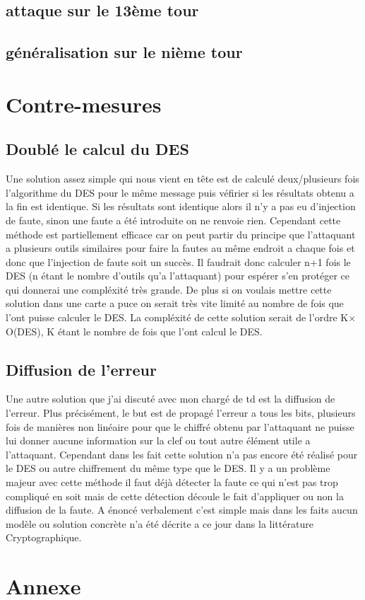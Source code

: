 \documentclass[a4paper]{report}
\begin{document}
			\section{attaque sur le 13ème tour}
			\section{généralisation sur le nième tour}
		
		\chapter{Contre-mesures}
			\section{Doublé le calcul du DES}
				Une solution assez simple qui nous vient en tête est de calculé deux/plusieurs fois l'algorithme du DES pour le même message puis véfirier si les résultats obtenu a la fin est
				identique.
				Si les résultats sont identique alors il n'y a pas eu d'injection de faute, sinon une faute a été introduite on ne renvoie rien.
				Cependant cette méthode est partiellement efficace car on peut partir du principe que l'attaquant a plusieurs outils similaires pour faire la fautes au même endroit a chaque fois et 
				donc que l'injection de faute soit un succès. 
				Il faudrait donc calculer n+1 fois le DES (n étant le nombre d'outils qu'a l'attaquant) pour espérer s'en protéger ce qui donnerai une compléxité très grande. 
				De plus si on voulais mettre cette solution dans une carte a puce on serait très vite limité au nombre de fois que l'ont puisse calculer le DES.
				La compléxité de cette solution serait de l'ordre K$\times$O(DES), K étant le nombre de fois que l'ont calcul le DES.
			
			\section{Diffusion de l'erreur}
				Une autre solution que j'ai discuté avec mon chargé de td est la diffusion de l'erreur. Plus précisément, le but est de propagé l'erreur a tous les bits, plusieurs fois de manières non linéaire pour que le chiffré obtenu par l'attaquant ne puisse lui donner aucune information sur la clef ou tout autre élément utile a l'attaquant.
				Cependant dans les fait cette solution n'a pas encore été réalisé pour le DES ou autre chiffrement du même type que le DES. Il y a un problème majeur avec cette méthode il faut déjà détecter la faute ce qui n'est pas trop compliqué en soit mais de cette détection découle le fait d'appliquer ou non la diffusion de la faute. A énoncé verbalement c'est simple mais dans les faits aucun modèle ou solution concrète n'a été décrite a ce jour dans la littérature Cryptographique.
		
		\chapter{Annexe}


		
\end{document}
